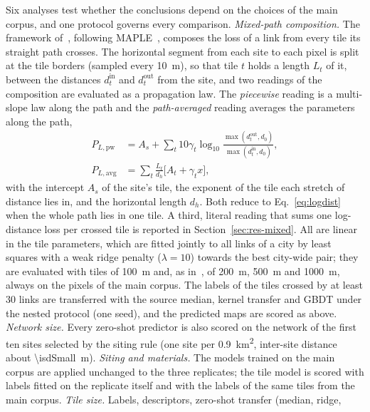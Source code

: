 Six analyses test whether the conclusions depend on the choices of the main
corpus, and one protocol governs every comparison. \emph{Mixed-path
composition.} The framework of~\cite{ozyurt2026}, following
MAPLE~\cite{ozyurt2020maple}, composes the loss of a link from every tile
its straight path crosses. The horizontal segment from each site to each
pixel is split at the tile borders (sampled every \SI{10}{\metre}), so that
tile $t$ holds a length $L_t$ of it, between the distances
$d_t^{\mathrm{in}}$ and $d_t^{\mathrm{out}}$ from the site, and two readings
of the composition are evaluated as a propagation law. The \emph{piecewise}
reading is a multi-slope law along the path and the \emph{path-averaged}
reading averages the parameters along the path,
\begin{equation}
\begin{aligned}
P_{L,\mathrm{pw}}&=A_{s}+\sum_t 10\gamma_t\log_{10}\frac{\max(d_t^{\mathrm{out}},d_0)}{\max(d_t^{\mathrm{in}},d_0)},\\
P_{L,\mathrm{avg}}&=\sum_t\frac{L_t}{d_h}\bigl[A_t+\gamma_t x\bigr],
\end{aligned}
\label{eq:mixed}
\end{equation}
with the intercept $A_s$ of the site's tile, the exponent of the tile each
stretch of distance lies in, and the horizontal length $d_h$. Both reduce
to Eq.~\eqref{eq:logdist} when the whole path lies in one tile. A third,
literal reading that sums one log-distance loss per crossed tile is
reported in Section~\ref{sec:res-mixed}. All are linear in the tile
parameters, which are fitted jointly to all links of a city by least squares
with a weak ridge penalty ($\lambda=10$) towards the best city-wide pair;
they are evaluated with tiles of \SI{100}{\metre} and, as
in~\cite{ozyurt2026}, of \SI{200}{\metre}, \SI{500}{\metre} and
\SI{1000}{\metre}, always on the pixels of the main corpus. The labels of
the tiles crossed by at least 30 links are transferred with the source
median, kernel transfer and GBDT under the nested protocol (one seed), and
the predicted maps are scored as above. \emph{Network size.} Every
zero-shot predictor is also scored on the network of the first ten sites
selected by the siting rule (one site per \SI{0.9}{\kilo\metre\squared},
inter-site distance about \SI{\isdSmall}{\metre}). \emph{Siting and
materials.} The models trained on the main corpus are applied unchanged to
the three replicates; the tile model is scored with labels fitted on the
replicate itself and with the labels of the same tiles from the main corpus.
\emph{Tile size.} Labels, descriptors, zero-shot transfer (median, ridge,
